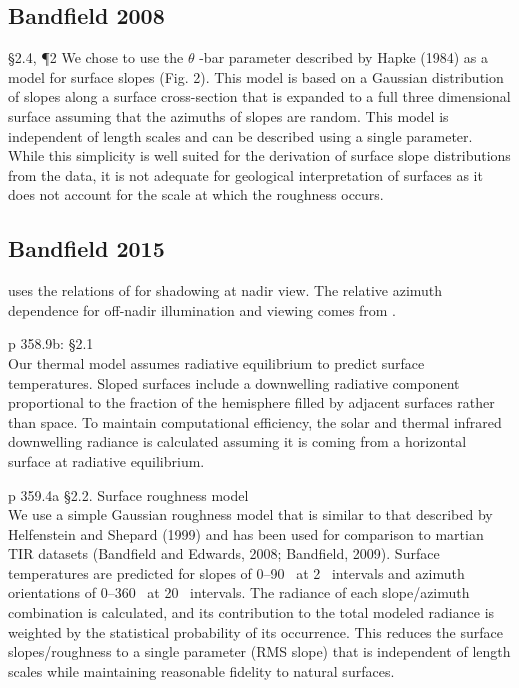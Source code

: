 \documentclass{article}
\begin{document}
\subsection{Bandfield 2008} %
\S 2.4, \P 2 \bq We chose to use the $\theta$ -bar parameter described by Hapke
(1984) as a model for surface slopes (Fig. 2). This model is based on a Gaussian
distribution of slopes along a surface cross-section that is expanded to a full
three dimensional surface assuming that the azimuths of slopes are random. This
model is independent of length scales and can be described using a single
parameter. While this simplicity is well suited for the derivation of surface
slope distributions from the data, it is not adequate for geological
interpretation of surfaces as it does not account for the scale at which the
roughness occurs. \eq

\subsection{Bandfield 2015} %
 uses the relations of  for shadowing at nadir
view. The relative azimuth dependence for off-nadir illumination and viewing comes from .

p 358.9b: \S 2.1 \\ 
\bq Our thermal model assumes radiative equilibrium to predict surface
temperatures. Sloped surfaces include a downwelling radiative component
proportional to the fraction of the hemisphere filled by adjacent surfaces
rather than space. To maintain computational efficiency, the solar and thermal
infrared downwelling radiance is calculated assuming it is coming from a
horizontal surface at radiative equilibrium. \eq

p 359.4a \S 2.2. Surface roughness model \\ 
\bq We use a simple Gaussian roughness model
that is similar to that described by Helfenstein and Shepard (1999) and has been
used for comparison to martian TIR datasets (Bandfield and Edwards, 2008;
Bandfield, 2009). Surface temperatures are predicted for slopes of 0–90\qd~ at
2\qd~ intervals and azimuth orientations of 0–360\qd~ at 20\qd~ intervals. The
radiance of each slope/azimuth combination is calculated, and its contribution
to the total modeled radiance is weighted by the statistical probability of its
occurrence. This reduces the surface slopes/roughness to a single parameter (RMS
slope) that is independent of length scales while maintaining reasonable
fidelity to natural surfaces.
\end{document}
